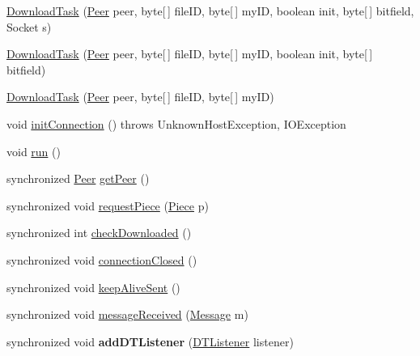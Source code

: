 \begin{DoxyCompactItemize}
\item 
\hyperlink{classj_bittorrent_a_p_i_1_1_download_task_a9df91103ea2899e6d56ed0d4bbb91c50}{DownloadTask} (\hyperlink{classj_bittorrent_a_p_i_1_1_peer}{Peer} peer, byte\mbox{[}$\,$\mbox{]} fileID, byte\mbox{[}$\,$\mbox{]} myID, boolean init, byte\mbox{[}$\,$\mbox{]} bitfield, Socket s)
\item 
\hyperlink{classj_bittorrent_a_p_i_1_1_download_task_a32181ebfc1d30259b58847cd6ffb527b}{DownloadTask} (\hyperlink{classj_bittorrent_a_p_i_1_1_peer}{Peer} peer, byte\mbox{[}$\,$\mbox{]} fileID, byte\mbox{[}$\,$\mbox{]} myID, boolean init, byte\mbox{[}$\,$\mbox{]} bitfield)
\item 
\hyperlink{classj_bittorrent_a_p_i_1_1_download_task_aa6305d83b8254e0768b5f4cb04d6c7c9}{DownloadTask} (\hyperlink{classj_bittorrent_a_p_i_1_1_peer}{Peer} peer, byte\mbox{[}$\,$\mbox{]} fileID, byte\mbox{[}$\,$\mbox{]} myID)
\item 
void \hyperlink{classj_bittorrent_a_p_i_1_1_download_task_a0e6aae72189862d442f35a9a0d9953ff}{initConnection} ()  throws UnknownHostException, IOException 
\item 
void \hyperlink{classj_bittorrent_a_p_i_1_1_download_task_a083abaff7ffe593b7994d079e5b5cbe8}{run} ()
\item 
synchronized \hyperlink{classj_bittorrent_a_p_i_1_1_peer}{Peer} \hyperlink{classj_bittorrent_a_p_i_1_1_download_task_acc97629e68b6c2cc0cdcf860907f4e09}{getPeer} ()
\item 
synchronized void \hyperlink{classj_bittorrent_a_p_i_1_1_download_task_abe8ce5e30e5cf362a889c239685b7885}{requestPiece} (\hyperlink{classj_bittorrent_a_p_i_1_1_piece}{Piece} p)
\item 
synchronized int \hyperlink{classj_bittorrent_a_p_i_1_1_download_task_a3449a9a800c67c5a039a50c8ea1757be}{checkDownloaded} ()
\item 
synchronized void \hyperlink{classj_bittorrent_a_p_i_1_1_download_task_aee45e53d98af60717f41840bc5e44c73}{connectionClosed} ()
\item 
synchronized void \hyperlink{classj_bittorrent_a_p_i_1_1_download_task_aaa3fad9c3cd6b12c46e76d291313060f}{keepAliveSent} ()
\item 
synchronized void \hyperlink{classj_bittorrent_a_p_i_1_1_download_task_a3234c0677a09c13fdd7926e894db570d}{messageReceived} (\hyperlink{classj_bittorrent_a_p_i_1_1_message}{Message} m)
\item 
\hypertarget{classj_bittorrent_a_p_i_1_1_download_task_a1241cab9e37da650b1155f51fa007726}{
synchronized void {\bfseries addDTListener} (\hyperlink{interfacej_bittorrent_a_p_i_1_1_d_t_listener}{DTListener} listener)}
\label{classj_bittorrent_a_p_i_1_1_download_task_a1241cab9e37da650b1155f51fa007726}


\end{DoxyCompactItemize}
